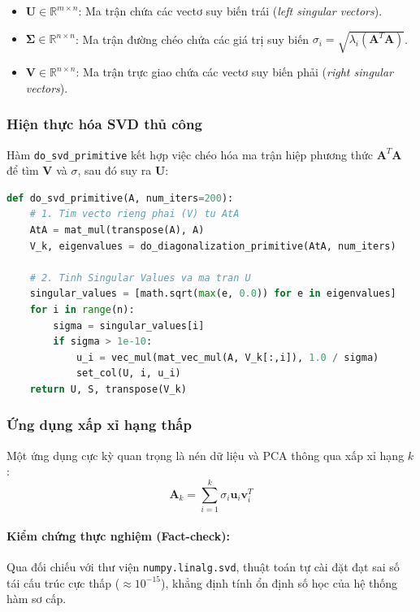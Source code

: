 \documentclass[12pt]{article}
\begin{document}
\begin{itemize}[label=$\bullet$, leftmargin=1.5cm]
    \item $\mathbf{U} \in \mathbb{R}^{m \times n}$: Ma trận chứa các vectơ suy biến trái (\textit{left singular vectors}).
    \item $\mathbf{\Sigma} \in \mathbb{R}^{n \times n}$: Ma trận đường chéo chứa các giá trị suy biến $\sigma_i = \sqrt{\lambda_i(\mathbf{A}^T\mathbf{A})}$.
    \item $\mathbf{V} \in \mathbb{R}^{n \times n}$: Ma trận trực giao chứa các vectơ suy biến phải (\textit{right singular vectors}).
\end{itemize}



\subsubsection{Hiện thực hóa SVD thủ công}
Hàm \texttt{do\_svd\_primitive} kết hợp việc chéo hóa ma trận hiệp phương thức $\mathbf{A}^T\mathbf{A}$ để tìm $\mathbf{V}$ và $\sigma$, sau đó suy ra $\mathbf{U}$:
\begin{lstlisting}[language=Python]
def do_svd_primitive(A, num_iters=200):
    # 1. Tim vecto rieng phai (V) tu AtA
    AtA = mat_mul(transpose(A), A)
    V_k, eigenvalues = do_diagonalization_primitive(AtA, num_iters)
    
    # 2. Tinh Singular Values va ma tran U
    singular_values = [math.sqrt(max(e, 0.0)) for e in eigenvalues]
    for i in range(n):
        sigma = singular_values[i]
        if sigma > 1e-10:
            u_i = vec_mul(mat_vec_mul(A, V_k[:,i]), 1.0 / sigma)
            set_col(U, i, u_i)
    return U, S, transpose(V_k)
\end{lstlisting}

\subsubsection{Ứng dụng xấp xỉ hạng thấp}
Một ứng dụng cực kỳ quan trọng là nén dữ liệu và PCA thông qua xấp xỉ hạng $k$:
\begin{equation}
\mathbf{A}_k = \sum_{i=1}^{k} \sigma_i \mathbf{u}_i \mathbf{v}_i^T \tag{8}
\end{equation}

\paragraph{Kiểm chứng thực nghiệm (Fact-check):}
Qua đối chiếu với thư viện \texttt{numpy.linalg.svd}, thuật toán tự cài đặt đạt sai số tái cấu trúc cực thấp ($\approx 10^{-15}$), khẳng định tính ổn định số học của hệ thống hàm sơ cấp.
\end{document}
